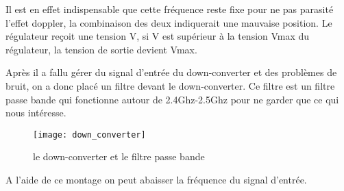 Il est en effet indispensable que cette fréquence reste fixe pour ne pas parasité l’effet doppler, la combinaison des deux indiquerait une mauvaise position.
Le régulateur reçoit une tension V, si V est supérieur à la tension Vmax du régulateur, la tension de sortie devient Vmax. 

Après il a fallu gérer du signal d’entrée du down-converter et des problèmes de bruit, on a donc placé un filtre devant le down-converter. Ce filtre est un filtre passe bande qui fonctionne autour de 2.4Ghz-2.5Ghz pour ne garder que ce qui nous intéresse.


\begin{figure}[h]
  \centering
  \texttt{[image: down\_converter]}
  \caption{le down-converter et le filtre passe bande}
  \label{fig:down}
\end{figure}

A l’aide de ce montage on peut abaisser la fréquence du signal d’entrée.

